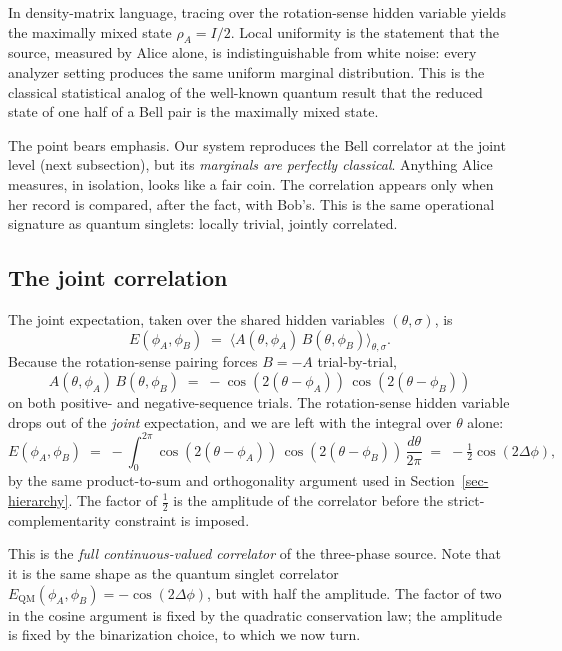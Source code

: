 \documentclass[
  11pt]{article}
\begin{document}
In density-matrix language, tracing over the rotation-sense hidden
variable yields the maximally mixed state \(\rho_A = I/2\). Local
uniformity is the statement that the source, measured by Alice alone, is
indistinguishable from white noise: every analyzer setting produces the
same uniform marginal distribution. This is the classical statistical
analog of the well-known quantum result that the reduced state of one
half of a Bell pair is the maximally mixed state.

The point bears emphasis. Our system reproduces the Bell correlator at
the joint level (next subsection), but its \emph{marginals are perfectly
classical}. Anything Alice measures, in isolation, looks like a fair
coin. The correlation appears only when her record is compared, after
the fact, with Bob's. This is the same operational signature as quantum
singlets: locally trivial, jointly correlated.

\subsection{The joint correlation}\label{the-joint-correlation}

The joint expectation, taken over the shared hidden variables
\((\theta, \sigma)\), is \[
E(\phi_A, \phi_B) \;=\; \big\langle A(\theta, \phi_A)\, B(\theta, \phi_B) \big\rangle_{\theta, \sigma}.
\] Because the rotation-sense pairing forces \(B = -A\) trial-by-trial,
\[
A(\theta, \phi_A)\, B(\theta, \phi_B) \;=\; -\cos(2(\theta - \phi_A))\,\cos(2(\theta - \phi_B))
\] on both positive- and negative-sequence trials. The rotation-sense
hidden variable drops out of the \emph{joint} expectation, and we are
left with the integral over \(\theta\) alone: \[
E(\phi_A, \phi_B) \;=\; -\int_0^{2\pi} \cos(2(\theta - \phi_A))\,\cos(2(\theta - \phi_B))\, \frac{d\theta}{2\pi} \;=\; -\tfrac{1}{2}\cos(2\Delta\phi),
\] by the same product-to-sum and orthogonality argument used in
Section~\ref{sec-hierarchy}. The factor of \(\tfrac{1}{2}\) is the
amplitude of the correlator before the strict-complementarity constraint
is imposed.

This is the \emph{full continuous-valued correlator} of the three-phase
source. Note that it is the same shape as the quantum singlet correlator
\(E_\text{QM}(\phi_A, \phi_B) = -\cos(2\Delta\phi)\), but with half the
amplitude. The factor of two in the cosine argument is fixed by the
quadratic conservation law; the amplitude is fixed by the binarization
choice, to which we now turn.
\end{document}
